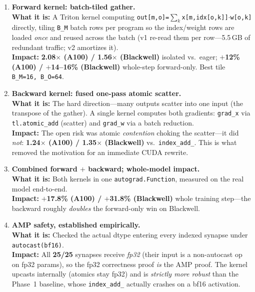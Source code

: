 \documentclass[11pt]{article}
\newcommand{\what}[1]{\textbf{What it is:} #1}
\newcommand{\impact}[1]{\textbf{Impact:} #1}
\begin{document}
\begin{center}
\end{center}

\begin{enumerate}[leftmargin=*, resume]

\item \textbf{Forward kernel: batch-tiled gather.}\\
\what{A Triton kernel computing \texttt{out[m,o]=$\sum_k$x[m,idx[o,k]]$\cdot$w[o,k]} directly,
tiling \texttt{B\_M} batch rows per program so the index/weight rows are loaded \emph{once} and
reused across the batch (v1 re-read them per row---5.5\,GB of redundant traffic; v2 amortizes it).}\\
\impact{\textbf{2.08$\times$ (A100) / 1.56$\times$ (Blackwell)} isolated vs.\ eager; \textbf{$+$12\%
(A100) / $+$14--16\% (Blackwell)} whole-step forward-only. Best tile \texttt{B\_M=16, B\_O=64}.}

\item \textbf{Backward kernel: fused one-pass atomic scatter.}\\
\what{The hard direction---many outputs scatter into one input (the transpose of the gather).
A single kernel computes both gradients: \texttt{grad\_x} via \texttt{tl.atomic\_add} (scatter) and
\texttt{grad\_w} via a batch reduction.}\\
\impact{The open risk was atomic \emph{contention} choking the scatter---it did \emph{not}:
\textbf{1.24$\times$ (A100) / 1.35$\times$ (Blackwell)} vs.\ \texttt{index\_add\_}. This is what
removed the motivation for an immediate CUDA rewrite.}

\item \textbf{Combined forward $+$ backward; whole-model impact.}\\
\what{Both kernels in one \texttt{autograd.Function}, measured on the real model end-to-end.}\\
\impact{\textbf{$+$17.8\% (A100) / $+$31.8\% (Blackwell)} whole training step---the backward
roughly \emph{doubles} the forward-only win on Blackwell.}

\item \textbf{AMP safety, established empirically.}\\
\what{Checked the actual dtype entering every indexed synapse under \texttt{autocast(bf16)}.}\\
\impact{All \textbf{25/25} synapses receive \emph{fp32} (their input is a non-autocast op on fp32
params), so the fp32 correctness proof \emph{is} the AMP proof. The kernel upcasts internally
(atomics stay fp32) and is \emph{strictly more robust} than the Phase~1 baseline, whose
\texttt{index\_add\_} actually crashes on a bf16 activation.}


\end{enumerate}
\end{document}
